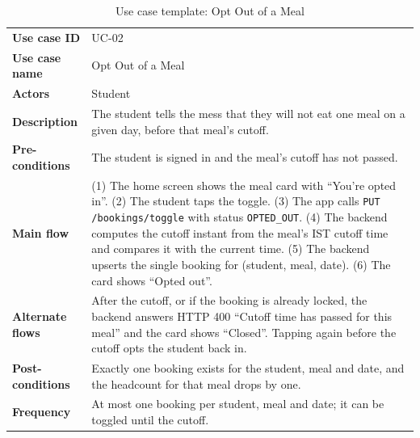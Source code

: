 \documentclass[11pt,a4paper]{article}
\begin{document}
\begin{table}[H]
\centering
\caption{Use case template: Opt Out of a Meal}
\label{tab:uc2}
\begin{tabular}{@{}L{3.1cm}L{11.7cm}@{}}
\toprule
\textbf{Use case ID} & UC-02\\
\textbf{Use case name} & Opt Out of a Meal\\
\textbf{Actors} & Student\\
\textbf{Description} & The student tells the mess that they will not eat one
meal on a given day, before that meal's cutoff.\\
\textbf{Pre-conditions} & The student is signed in and the meal's cutoff has not
passed.\\
\textbf{Main flow} & (1) The home screen shows the meal card with ``You're opted
in''. (2) The student taps the toggle. (3) The app calls
\texttt{PUT /bookings/toggle} with status \texttt{OPTED\_OUT}. (4) The backend
computes the cutoff instant from the meal's IST cutoff time and compares it with
the current time. (5) The backend upserts the single booking for
(student, meal, date). (6) The card shows ``Opted out''.\\
\textbf{Alternate flows} & After the cutoff, or if the booking is already
locked, the backend answers HTTP 400 ``Cutoff time has passed for this meal'' and
the card shows ``Closed''. Tapping again before the cutoff opts the student back
in.\\
\textbf{Post-conditions} & Exactly one booking exists for the student, meal and
date, and the headcount for that meal drops by one.\\
\textbf{Frequency} & At most one booking per student, meal and date; it can be toggled until the cutoff.\\
\bottomrule
\end{tabular}
\end{table}
\end{document}
